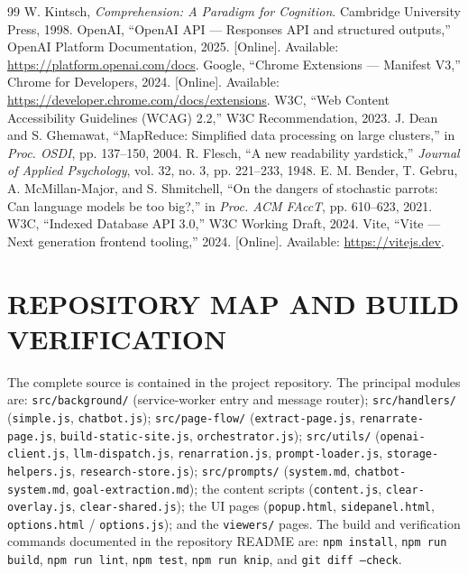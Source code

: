 \documentclass[a4paper,12pt]{report}
\begin{document}
\begin{thebibliography}{99}
 W. Kintsch, \textit{Comprehension: A Paradigm for Cognition}. Cambridge University Press, 1998.
 OpenAI, ``OpenAI API --- Responses API and structured outputs,'' OpenAI Platform Documentation, 2025. [Online]. Available: \url{https://platform.openai.com/docs}.
 Google, ``Chrome Extensions --- Manifest V3,'' Chrome for Developers, 2024. [Online]. Available: \url{https://developer.chrome.com/docs/extensions}.
 W3C, ``Web Content Accessibility Guidelines (WCAG) 2.2,'' W3C Recommendation, 2023.
 J. Dean and S. Ghemawat, ``MapReduce: Simplified data processing on large clusters,'' in \textit{Proc. OSDI}, pp. 137--150, 2004.
 R. Flesch, ``A new readability yardstick,'' \textit{Journal of Applied Psychology}, vol. 32, no. 3, pp. 221--233, 1948.
 E. M. Bender, T. Gebru, A. McMillan-Major, and S. Shmitchell, ``On the dangers of stochastic parrots: Can language models be too big?,'' in \textit{Proc. ACM FAccT}, pp. 610--623, 2021.
 W3C, ``Indexed Database API 3.0,'' W3C Working Draft, 2024.
 Vite, ``Vite --- Next generation frontend tooling,'' 2024. [Online]. Available: \url{https://vitejs.dev}.
\end{thebibliography}

\appendix
\chapter{REPOSITORY MAP AND BUILD VERIFICATION}
The complete source is contained in the project repository. The principal
modules are: \texttt{src/background/} (service-worker entry and message router);
\texttt{src/handlers/} (\texttt{simple.js}, \texttt{chatbot.js});
\texttt{src/page-flow/} (\texttt{extract-page.js}, \texttt{renarrate-page.js},
\texttt{build-static-site.js}, \texttt{orchestrator.js});
\texttt{src/utils/} (\texttt{openai-client.js}, \texttt{llm-dispatch.js},
\texttt{renarration.js}, \texttt{prompt-loader.js}, \texttt{storage-helpers.js},
\texttt{research-store.js}); \texttt{src/prompts/} (\texttt{system.md},
\texttt{chatbot-system.md}, \texttt{goal-extraction.md}); the content scripts
(\texttt{content.js}, \texttt{clear-overlay.js}, \texttt{clear-shared.js}); the UI
pages (\texttt{popup.html}, \texttt{sidepanel.html}, \texttt{options.html} /
\texttt{options.js}); and the \texttt{viewers/} pages. The build and verification
commands documented in the repository README are:
\texttt{npm install}, \texttt{npm run build}, \texttt{npm run lint},
\texttt{npm test}, \texttt{npm run knip}, and \texttt{git diff --check}.
\end{document}
